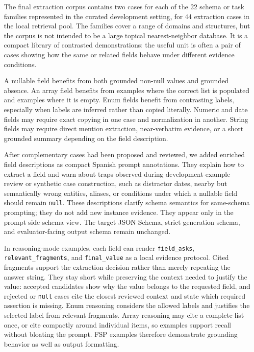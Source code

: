 The final extraction corpus contains two cases for each of the 22 schema or task families represented in the curated development setting, for 44 extraction cases in the local retrieval pool. The families cover a range of domains and structures, but the corpus is not intended to be a large topical nearest-neighbor database. It is a compact library of contrasted demonstrations: the useful unit is often a pair of cases showing how the same or related fields behave under different evidence conditions.

A nullable field benefits from both grounded non-null values and grounded absence. An array field benefits from examples where the correct list is populated and examples where it is empty. Enum fields benefit from contrasting labels, especially when labels are inferred rather than copied literally. Numeric and date fields may require exact copying in one case and normalization in another. String fields may require direct mention extraction, near-verbatim evidence, or a short grounded summary depending on the field description.

After complementary cases had been proposed and reviewed, we added enriched field descriptions as compact Spanish prompt annotations. They explain how to extract a field and warn about traps observed during development-example review or synthetic case construction, such as distractor dates, nearby but semantically wrong entities, aliases, or conditions under which a nullable field should remain \texttt{null}. These descriptions clarify schema semantics for same-schema prompting; they do not add new instance evidence. They appear only in the prompt-side schema view. The target JSON Schema, strict generation schema, and evaluator-facing output schema remain unchanged.

In reasoning-mode examples, each field can render \texttt{field\_asks}, \texttt{relevant\_fragments}, and \texttt{final\_value} as a local evidence protocol. Cited fragments support the extraction decision rather than merely repeating the answer string. They stay short while preserving the context needed to justify the value: accepted candidates show why the value belongs to the requested field, and rejected or \texttt{null} cases cite the closest reviewed context and state which required assertion is missing. Enum reasoning considers the allowed labels and justifies the selected label from relevant fragments. Array reasoning may cite a complete list once, or cite compactly around individual items, so examples support recall without bloating the prompt. FSP examples therefore demonstrate grounding behavior as well as output formatting.

